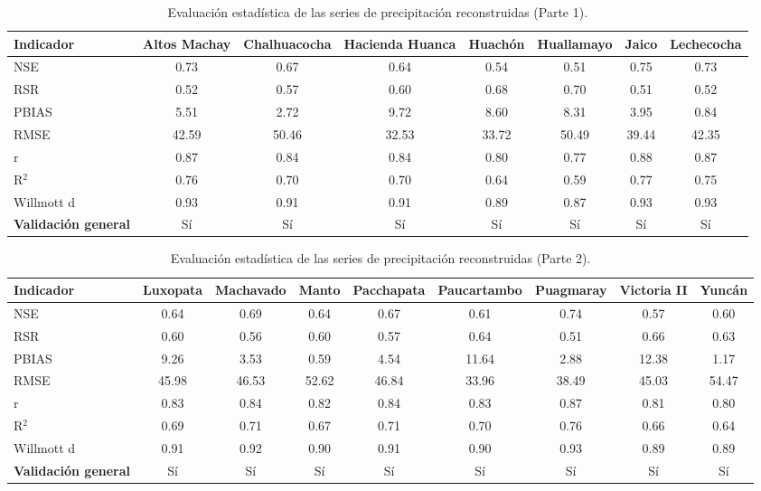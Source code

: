 \begin{table}[ht]
\centering
\caption{Evaluaci\'on estad\'istica de las series de precipitaci\'on reconstruidas (Parte 1).}
\label{tab:reconstruccion_parte1}
\scriptsize
\begin{tabular}{l c c c c c c c}
\toprule
\textbf{Indicador} & Altos Machay & Chalhuacocha & Hacienda Huanca & Huachón &
Huallamayo & Jaico & Lechecocha \\
\midrule
NSE        & 0.73 & 0.67 & 0.64 & 0.54 & 0.51 & 0.75 & 0.73 \\
RSR        & 0.52 & 0.57 & 0.60 & 0.68 & 0.70 & 0.51 & 0.52 \\
PBIAS      & 5.51 & 2.72 & 9.72 & 8.60 & 8.31 & 3.95 & 0.84 \\
RMSE       & 42.59 & 50.46 & 32.53 & 33.72 & 50.49 & 39.44 & 42.35 \\
r          & 0.87 & 0.84 & 0.84 & 0.80 & 0.77 & 0.88 & 0.87 \\
R$^2$      & 0.76 & 0.70 & 0.70 & 0.64 & 0.59 & 0.77 & 0.75 \\
Willmott d & 0.93 & 0.91 & 0.91 & 0.89 & 0.87 & 0.93 & 0.93 \\
\textbf{Validaci\'on general} 
           & S\'i & S\'i & S\'i & S\'i  & S\'i & S\'i & S\'i \\
\bottomrule
\end{tabular}
\label{tab02}
\end{table}

\begin{table}[ht]
\centering
\caption{Evaluaci\'on estad\'istica de las series de precipitaci\'on reconstruidas (Parte 2).}
\label{tab:reconstruccion_parte2}
\scriptsize
\begin{tabular}{l c c c c c c c c}
\toprule
\textbf{Indicador} & Luxopata & Machavado & Manto & Pacchapata & Paucartambo &
Puagmaray & Victoria II & Yuncán \\
\midrule
NSE         & 0.64 & 0.69 & 0.64 & 0.67 & 0.61 & 0.74 & 0.57 & 0.60 \\
RSR         & 0.60 & 0.56 & 0.60 & 0.57 & 0.64 & 0.51 & 0.66 & 0.63 \\
PBIAS       & 9.26 & 3.53 & 0.59 & 4.54 & 11.64 & 2.88 & 12.38 & 1.17 \\
RMSE        & 45.98 & 46.53 & 52.62 & 46.84 & 33.96 & 38.49 & 45.03 & 54.47 \\
r           & 0.83 & 0.84 & 0.82 & 0.84 & 0.83 & 0.87 & 0.81 & 0.80 \\
R$^2$       & 0.69 & 0.71 & 0.67 & 0.71 & 0.70 & 0.76 & 0.66 & 0.64 \\
Willmott d  & 0.91 & 0.92 & 0.90 & 0.91 & 0.90 & 0.93 & 0.89 & 0.89 \\
\textbf{Validaci\'on general} 
            & S\'i & S\'i & S\'i & S\'i & S\'i & S\'i & S\'i & S\'i \\
\bottomrule
\end{tabular}
\label{tab03}
\end{table}

